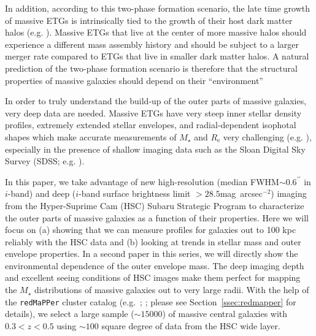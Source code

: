 \documentclass[a4paper,fleqn,usenatbib]{mnras}
\def\arcsec{{\prime\prime}}
\def\sb{mag~arcsec$^{-2}$}
\def\redm{\texttt{redMaPPer}}
\def\mstar{{$M_{\star}$}}
\def\mden{{$\mu_{\star}$}}
\begin{document}
    In addition, according to this two-phase formation scenario, the late time growth of massive ETGs 
    is intrinsically tied to the growth of their host dark matter halos 
    (e.g. \citealt{Leauthaud2012, Behroozi2013, Shankar2013}). 
    Massive ETGs that live at the center of more massive halos should experience 
    a different mass assembly history and should be subject to a larger merger rate 
    compared to ETGs that live in smaller dark matter halos. 
    A natural prediction of the two-phase formation scenario is therefore that the 
    structural properties of massive galaxies should depend on their ``environment''
    
    In order to truly understand the build-up of the outer parts of massive galaxies, very 
    deep data are needed. Massive ETGs have very steep inner stellar density profiles, 
    extremely extended stellar envelopes, and radial-dependent isophotal shapes which 
    make accurate measurements of \mstar{} and $R_{\mathrm{e}}$ very challenging
    (e.g. \citealt{Bernardi2013, DSouza2014}), 
    especially in the presence of shallow imaging data such as the Sloan Digital Sky 
    Survey (SDSS; e.g. \citealt{SDSSDR7, SDSSDR12}). 
       
    In this paper, we take advantage of new high-resolution (median 
    FWHM${\sim} 0.6^{\arcsec}$ in $i$-band) and deep ($i$-band surface brightness 
    limit $> 28.5$\sb) imaging from the Hyper-Suprime Cam (HSC) Subaru Strategic 
    Program \citep[SSP,][]{HSCDR1} to characterize the outer parts of massive galaxies 
    as a function of their properties. Here we will focus on (a) showing that we can 
    measure profiles for galaxies out to 100 kpc reliably with the HSC data and (b) looking at 
    trends in stellar mass and outer envelope properties. In a second paper in this series, we 
    will directly show the environmental dependence of the outer envelope mass.
    The deep imaging depth and excellent seeing conditions of HSC images make them 
    perfect for mapping the \mstar{} distributions of massive galaxies out to very 
    large radii. 
    With the help of the \redm{} cluster catalog (e.g.\ \citealt{Rykoff2014}; 
    \citealt{Rozo2015b}; please see Section~\ref{ssec:redmapper} for details), we 
    select a large sample (${\sim} 15000$) of massive central 
    galaxies with $0.3 < z < 0.5$ using ${\sim} 100$ square degree of data from the 
    HSC wide layer.
    
\end{document}
